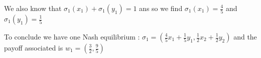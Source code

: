 We also know that $\sigma_1(x_1) + \sigma_1(y_1) = 1$ ans so we find $\sigma_1(x_1)=\frac{4}{5}$ and $\sigma_1(y_1)=\frac{1}{5}$

To conclude we have one Nash equilibrium :
$\sigma_1 = \left( \frac{4}{5}x_1 + \frac{1}{5}y_1, \frac{1}{2}x_2 + \frac{1}{2}y_2\right)$ and the payoff associated is $w_1= \left(\frac{3}{2},\frac{9}{5}\right)$
        
  
  
 
 
 
 
 
 
 
 
 
 
 
 
 
 